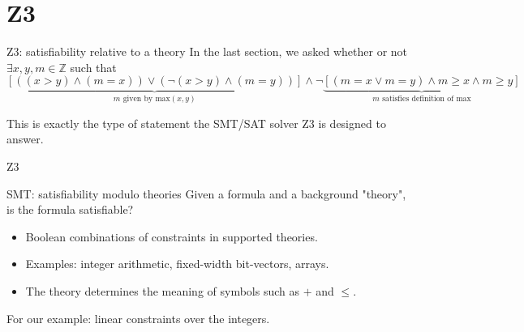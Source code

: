 \section{Z3}
\begin{frame}{Z3: satisfiability relative to a theory}
    In the last section, we asked whether or not
    $\exists x,y,m\in\mathbb{Z}$ such that
\[
\underbrace{\left[((x>y)\land (m=x))\lor(\lnot(x>y)\land (m=y))\right] }_{m\text{ given by max}(x,y)}
\land \lnot\underbrace{\left[ (m=x \lor m=y) \land m\geq x\land m\geq y\right]}_{m\text{ satisfies definition of max}}
\]

\par
This is exactly the type of statement the SMT/SAT solver Z3 is designed to answer.
\end{frame}

\begin{frame}{Z3}


\begin{block}{SMT: satisfiability modulo theories}
    Given a formula and a background "theory", is the formula satisfiable?
\end{block}
\begin{itemize}
\item Boolean combinations of constraints in supported theories.
\item Examples: integer arithmetic, fixed-width bit-vectors, arrays.
\item The theory determines the meaning of symbols such as $+$ and $\le$.
\end{itemize}
\medskip For our example: linear constraints over the integers.
\end{frame}

